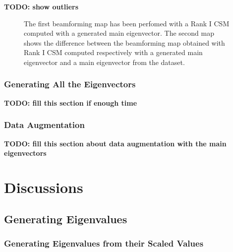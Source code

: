 \documentclass[11pt,a4paper,twoside]{report}
\begin{document}
\textbf{TODO: show outliers}

\begin{figure}
    \centering
    \caption{The first beamforming map has been perfomed with a Rank I CSM computed with a generated main eigenvector. The second map shows the difference between the beamforming map obtained with Rank I CSM computed respectively with a generated main eigenvector and a main eigenvector from the dataset.}
    \label{fig:beamforming_map_main_evec_wgangp}    
\end{figure}

\subsection{Generating All the Eigenvectors}

\textbf{TODO: fill this section if enough time}

\subsection{Data Augmentation}

\textbf{TODO: fill this section about data augmentation with the main eigenvectors}

\chapter{Discussions}

\section{Generating Eigenvalues}

\subsection{Generating Eigenvalues from their Scaled Values}
\end{document}
